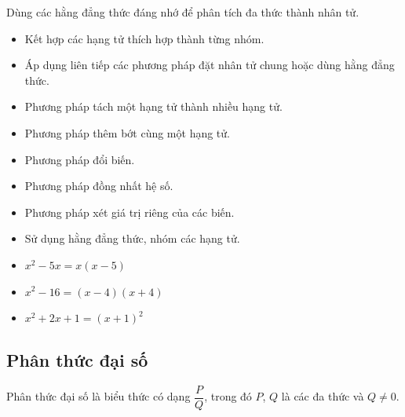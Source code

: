 \documentclass[12pt,a4paper]{article}
\begin{document}
\begin{phuongphap}[title={Phương pháp dùng hằng đẳng thức}]
  Dùng các hằng đẳng thức đáng nhớ để phân tích đa thức thành nhân tử.
\end{phuongphap}

\begin{phuongphap}[title={Phương pháp nhóm nhiều hạng tử và phối hợp các phương pháp}]
  \begin{itemize}
    \item Kết hợp các hạng tử thích hợp thành từng nhóm.
    \item Áp dụng liên tiếp các phương pháp đặt nhân tử chung hoặc dùng hằng đẳng thức.
  \end{itemize}
\end{phuongphap}

\begin{phuongphap}[title={Một số phương pháp nâng cao}]
  \begin{itemize}
    \item Phương pháp tách một hạng tử thành nhiều hạng tử.
    \item Phương pháp thêm bớt cùng một hạng tử.
    \item Phương pháp đổi biến.
    \item Phương pháp đồng nhất hệ số.
    \item Phương pháp xét giá trị riêng của các biến.
    \item Sử dụng hằng đẳng thức, nhóm các hạng tử.
  \end{itemize}
\end{phuongphap}

\begin{vidu}
  \begin{itemize}
    \item $x^2 - 5x = x(x - 5)$
    \item $x^2 - 16 = (x - 4)(x + 4)$
    \item $x^2 + 2x + 1 = (x + 1)^2$
  \end{itemize}
\end{vidu}

\subsection{Phân thức đại số}

\begin{dinhnghia}
  Phân thức đại số là biểu thức có dạng $\dfrac{P}{Q}$, trong đó $P$, $Q$ là các đa thức và $Q \ne 0$.
\end{dinhnghia}
\end{document}
